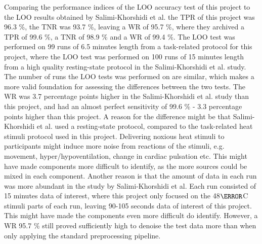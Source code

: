 Comparing the performance indices of the LOO accuracy test of this project to the LOO results obtained by Salimi-Khorshidi et al. \cite{Salimi-Khorshidi2014} the TPR of this project was 96.3 \%, the TNR was 93.7 \%, leaving a  WR of 95.7 \%, where they archived a TPR of 99.6 \%, a TNR of 98.9 \% and a WR of 99.4 \%. The LOO test was performed on 99 runs of 6.5 minutes length from a task-related protocol for this project, where the LOO test was performed on 100 runs of 15 minutes length from a high quality resting-state protocol in the Salimi-Khorshidi et al. study. The number of runs the LOO tests was performed on are similar, which makes a more valid foundation for assessing the differences between the two tests. 
The WR was 3.7 percentage points higher in the Salimi-Khorshidi et al. study than this project, and had an almost perfect sensitivity of 99.6 \% - 3.3 percentage points higher than this project. A reason for the difference might be that Salimi-Khorshidi et al. used a resting-state protocol, compared to the task-related heat stimuli protocol used in this project. Delivering noxious heat stimuli to participants might induce more noise from reactions of the stimuli, e.g. movement, hyper/hypoventilation, change in cardiac pulsation etc. This might have made components more difficult to identify, as the more sources could be mixed in each component. Another reason is that the amount of data in each run was more abundant in the study by Salimi-Khorshidi et al. Each run consisted of 15 minutes data of interest, where this project only focused on the 48$\degree$C stimuli parts of each run, leaving 90-105 seconds data of interest of this project. This might have made the components even more difficult do identify. However, a WR 95.7 \% still proved sufficiently high to denoise the test data more than when only applying the standard preprocessing pipeline. 

